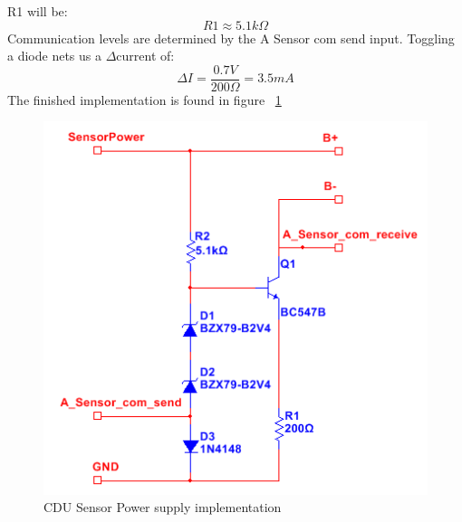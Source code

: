R1 will be:
\begin{equation}
	R1 \approx 5.1k\Omega
\end{equation}
Communication levels are determined by the A Sensor com send input. Toggling a diode nets us a $\Delta$current of:
\begin{equation}
	\Delta I = \frac{0.7V}{200\Omega} = 3.5 mA
\end{equation}
The finished implementation is found in figure ~\ref{fig:CDUimpsps}
\begin{figure}[H]
	\centering
	\includegraphics[scale=0.8]{billeder/impsps}
	\caption{CDU Sensor Power supply implementation}
	\label{fig:CDUimpsps}
\end{figure}


